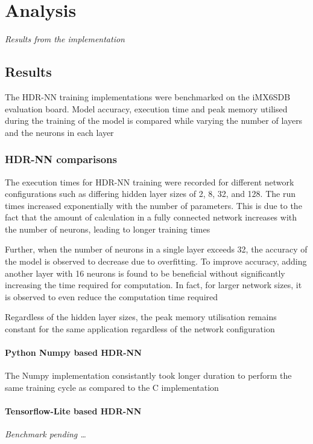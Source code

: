 \part{Analysis}
\textit{Results from the implementation}

\chapter{Results}

The HDR-NN training implementations were benchmarked on the iMX6SDB evaluation board. Model accuracy, execution time and peak memory utilised during the training of the model is compared while varying the number of layers and the neurons in each layer

\section{HDR-NN comparisons}

The execution times for HDR-NN training were recorded for different network configurations such as differing hidden layer sizes of 2, 8, 32, and 128. The run times increased exponentially with the number of parameters. This is due to the fact that the amount of calculation in a fully connected network increases with the number of neurons, leading to longer training times

Further, when the number of neurons in a single layer exceeds 32, the accuracy of the model is observed to decrease due to overfitting. To improve accuracy, adding another layer with 16 neurons is found to be beneficial without significantly increasing the time required for computation. In fact, for larger network sizes, it is observed to even reduce the computation time required

Regardless of the hidden layer sizes, the peak memory utilisation remains constant for the same application regardless of the network configuration

\subsection[Python - Numpy]{Python Numpy based HDR-NN}

The Numpy implementation consistantly took longer duration to perform the same training cycle as compared to the C implementation

\subsection[Tensorflow Lite]{Tensorflow-Lite based HDR-NN}
\textit{Benchmark pending \dots}

